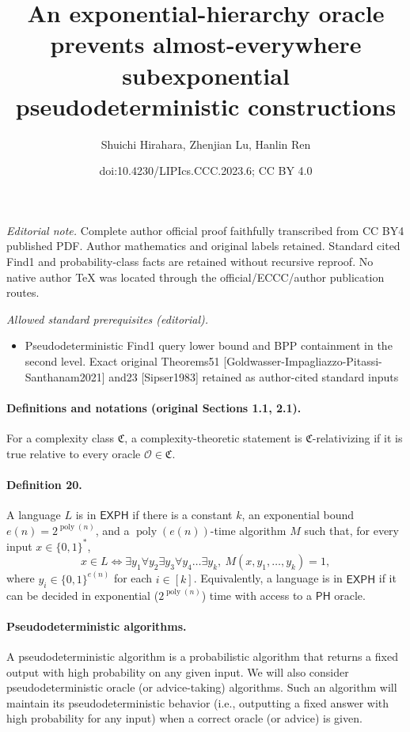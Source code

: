 \documentclass[10pt,a4paper]{article}
\title{An exponential-hierarchy oracle prevents almost-everywhere subexponential pseudodeterministic constructions}
\author{Shuichi Hirahara, Zhenjian Lu, Hanlin Ren}
\date{doi:10.4230/LIPIcs.CCC.2023.6; CC BY 4.0}
\begin{document}
\maketitle
\noindent\textit{Editorial note.} Complete author official proof faithfully transcribed from CC BY4 published PDF. Author mathematics and original labels retained. Standard cited Find1 and probability-class facts are retained without recursive reproof. No native author TeX was located through the official/ECCC/author publication routes.\par\medskip
\noindent\textit{Allowed standard prerequisites (editorial).}\begin{itemize}
\item Pseudodeterministic Find1 query lower bound and BPP containment in the second level. Exact original Theorems51 [Goldwasser-Impagliazzo-Pitassi-Santhanam2021] and23 [Sipser1983] retained as author-cited standard inputs
\end{itemize}\medskip
\paragraph{Definitions and notations (original Sections 1.1, 2.1).}
For a complexity class $\mathfrak C$, a complexity-theoretic statement is $\mathfrak C$-relativizing if it is true relative to every oracle $\mathcal O\in\mathfrak C$.
\paragraph{Definition 20.} A language $L$ is in $\mathsf{EXPH}$ if there is a constant $k$, an exponential bound $e(n)=2^{\operatorname{poly}(n)}$, and a $\operatorname{poly}(e(n))$-time algorithm $M$ such that, for every input $x\in\{0,1\}^*$,
\[x\in L\Longleftrightarrow\exists y_1\forall y_2\exists y_3\forall y_4\ldots\exists y_k,\ M(x,y_1,\ldots,y_k)=1,\]
where $y_i\in\{0,1\}^{e(n)}$ for each $i\in[k]$. Equivalently, a language is in $\mathsf{EXPH}$ if it can be decided in exponential ($2^{\operatorname{poly}(n)}$) time with access to a $\mathsf{PH}$ oracle.
\paragraph{Pseudodeterministic algorithms.} A pseudodeterministic algorithm is a probabilistic algorithm that returns a fixed output with high probability on any given input. We will also consider pseudodeterministic oracle (or advice-taking) algorithms. Such an algorithm will maintain its pseudodeterministic behavior (i.e., outputting a fixed answer with high probability for any input) when a correct oracle (or advice) is given.
\end{document}
